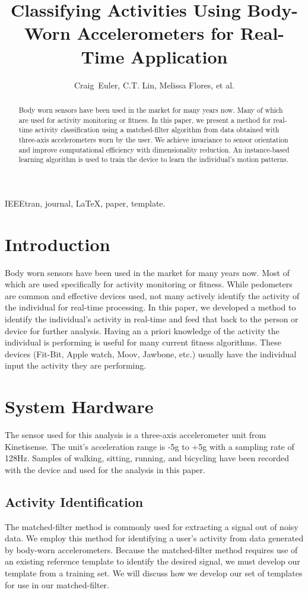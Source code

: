 \documentclass[journal]{IEEEtran}
\begin{document}
%
\title{Classifying Activities Using Body-Worn Accelerometers for Real-Time Application}
%
\author{Craig~Euler, C.T. Lin, Melissa Flores, et al.}
%
\maketitle
%
\begin{abstract}
Body worn sensors have been used in the market for many years now. Many of which are used 
for activity monitoring or fitness. In this paper, we present a method for real-time activity 
classification using a matched-filter algorithm from data obtained with three-axis accelerometers 
worn by the user.
We achieve invariance to sensor orientation and improve computational efficiency 
with dimensionality reduction. An instance-based learning algorithm is used to train 
the device to learn the individual's motion patterns.
\end{abstract}
%
\begin{IEEEkeywords}
IEEEtran, journal, \LaTeX, paper, template.
\end{IEEEkeywords}
\IEEEpeerreviewmaketitle
%
\section{Introduction}
Body worn sensors have been used in the market for many years now. 
Most of which are used specifically for activity monitoring or fitness. 
While pedometers are common and effective devices used, not many actively identify the activity 
of the individual for real-time processing. In this paper, we developed a method to 
identify the individual’s activity in real-time and feed that back to the person or device 
for further analysis. Having an a priori knowledge of the activity the individual is performing 
is useful for many current fitness algorithms. These devices (Fit-Bit, Apple watch, Moov, 
Jawbone, etc.) usually have the individual input the activity they are performing.
%
\section{System Hardware}
The sensor used for this analysis is a three-axis accelerometer unit from Kinetisense. 
The unit’s acceleration range is -5g to +5g with a sampling rate of 128Hz. 
Samples of walking, sitting, running, and bicycling have been recorded with the device 
and used for the analysis in this paper.
%
\subsection{Activity Identification}
The matched-filter method is commonly used for extracting a signal out of noisy data. 
We employ this method for identifying a user’s activity from data generated by body-worn accelerometers. 
Because the matched-filter method requires use of an existing reference template to identify the desired 
signal, we must develop our template from a training set. We will discuss how we develop our set of 
templates for use in our matched-filter.
%
\end{document}
